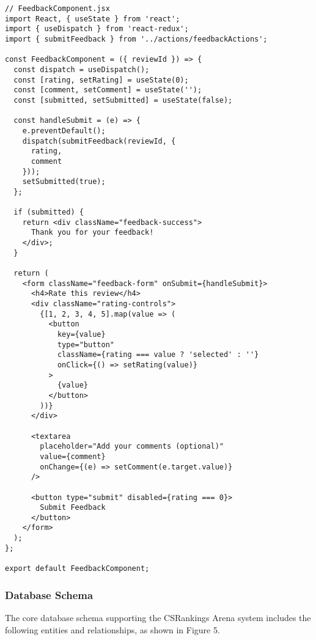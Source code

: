 \documentclass[conference]{IEEEtran}
\begin{document}
\begin{verbatim}
// FeedbackComponent.jsx
import React, { useState } from 'react';
import { useDispatch } from 'react-redux';
import { submitFeedback } from '../actions/feedbackActions';

const FeedbackComponent = ({ reviewId }) => {
  const dispatch = useDispatch();
  const [rating, setRating] = useState(0);
  const [comment, setComment] = useState('');
  const [submitted, setSubmitted] = useState(false);
  
  const handleSubmit = (e) => {
    e.preventDefault();
    dispatch(submitFeedback(reviewId, {
      rating,
      comment
    }));
    setSubmitted(true);
  };
  
  if (submitted) {
    return <div className="feedback-success">
      Thank you for your feedback!
    </div>;
  }
  
  return (
    <form className="feedback-form" onSubmit={handleSubmit}>
      <h4>Rate this review</h4>
      <div className="rating-controls">
        {[1, 2, 3, 4, 5].map(value => (
          <button
            key={value}
            type="button"
            className={rating === value ? 'selected' : ''}
            onClick={() => setRating(value)}
          >
            {value}
          </button>
        ))}
      </div>
      
      <textarea
        placeholder="Add your comments (optional)"
        value={comment}
        onChange={(e) => setComment(e.target.value)}
      />
      
      <button type="submit" disabled={rating === 0}>
        Submit Feedback
      </button>
    </form>
  );
};

export default FeedbackComponent;
\end{verbatim}

\subsubsection{Database Schema}
The core database schema supporting the CSRankings Arena system includes the following entities and relationships, as shown in Figure 5.
\end{document}
